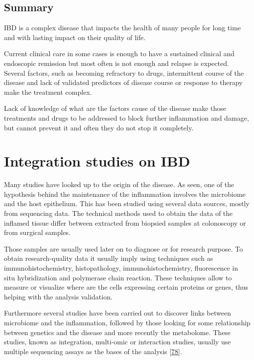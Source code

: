 \documentclass[
  12pt,
  a4paper,
  twoside,
  openright]{book}
\begin{document}
\hypertarget{summary-ibd}{%
\subsection{Summary}\label{summary-ibd}}

IBD is a complex disease that impacts the health of many people for long time and with lasting impact on their quality of life.

Current clinical care in some cases is enough to have a sustained clinical and endoscopic remission but most often is not enough and relapse is expected.
Several factors, such as becoming refractory to drugs, intermittent course of the disease and lack of validated predictors of disease course or response to therapy make the treatment complex.

Lack of knowledge of what are the factors cause of the disease make those treatments and drugs to be addressed to block further inflammation and damage, but cannot prevent it and often they do not stop it completely.

\hypertarget{integration-studies-on-ibd}{%
\section{Integration studies on IBD}\label{integration-studies-on-ibd}}

Many studies have looked up to the origin of the disease.
As seen, one of the hypothesis behind the maintenance of the inflammation involves the microbiome and the host epithelium.
This has been studied using several data sources, mostly from sequencing data.
The technical methods used to obtain the data of the inflamed tissue differ between extracted from biopsied samples at colonoscopy or from surgical samples.

Those samples are usually used later on to diagnose or for research purpose.
To obtain research-quality data it usually imply using techniques such as immunohistochemistry, histopathology, immunohistochemistry, fluorescence in situ hybridization and polymerase chain reaction.
These techniques allow to measure or visualize where are the cells expressing certain proteins or genes, thus helping with the analysis validation.

Furthermore several studies have been carried out to discover links between microbiome and the inflammation, followed by those looking for some relationship between genetics and the disease and more recently the metabolome.
These studies, known as integration, multi-omic or interaction studies, usually use multiple sequencing assays as the bases of the analysis {[}\protect\hyperlink{ref-beck2021}{78}{]}.
\end{document}
